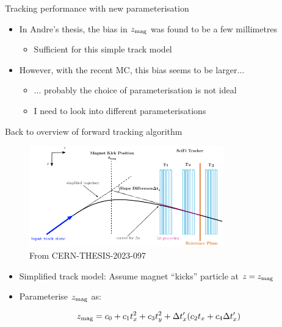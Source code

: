 \documentclass[xcolor={dvipsnames}]{beamer}
\begin{document}
\begin{frame}{Tracking performance with new parameterisation}
\begin{itemize}
    \setlength\itemsep{1.0em}
    \item{In Andre's thesis, the bias in $z_{\rm mag}$ was found to be a few millimetres}
    \begin{itemize}
      \item{Sufficient for this simple track model}
    \end{itemize}
    \item{However, with the recent MC, this bias seems to be larger...}
    \begin{itemize}
      \item{... probably the choice of parameterisation is not ideal}
      \item{I need to look into different parameterisations}
    \end{itemize}
  \end{itemize}
  \vspace{0.9cm}
\end{frame}

\begin{frame}{Back to overview of forward tracking algorithm}
  \vspace{0.0cm}
  \begin{figure}[htb]
    \centering
    \includegraphics[width=0.75\textwidth]{Plots/MagnetKinkPosition.png}
    \caption*{\small From CERN-THESIS-2023-097}
  \end{figure}
  \begin{itemize}
    \item{Simplified track model: Assume magnet ``kicks'' particle at $z = z_{\rm mag}$}
    \item{Parameterise $z_{\rm mag}$ as:}
  \end{itemize}
  \begin{equation*}
    z_{\rm mag} = c_0 + c_1t_x^2 + c_3t_y^2 + \Delta t_x^\prime(c_2t_x + c_4\Delta t_x^\prime)
  \end{equation*}
\end{frame}
\end{document}
